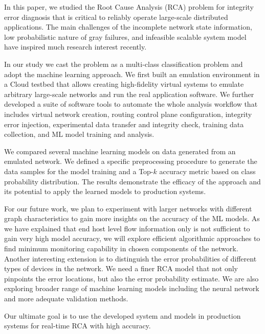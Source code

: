 In this paper, we studied the Root Cause Analysis (RCA) problem for integrity error diagnosis that is critical to reliably operate large-scale distributed applications. The main challenges of the incomplete network state information, low probabilistic nature of gray failures, and infeasible scalable system model have inspired much research interest recently.

In our study we cast the problem as a multi-class classification problem and adopt the machine learning approach. We first built an emulation environment in a Cloud testbed that allows creating high-fidelity virtual systems to emulate arbitrary large-scale networks and run the real application software. We further developed a suite of software tools to automate the whole analysis workflow that includes virtual network creation, routing control plane configuration, integrity error injection, experimental data transfer and integrity check, training data collection, and ML model training and analysis.

We compared several machine learning models on data generated from an emulated network. We defined a specific preprocessing procedure to generate the data samples for the model training and a Top-$k$ accuracy metric based on class probability distribution. The results demonstrate the efficacy of the approach and its potential to apply the learned models to production systems.  

For our future work, we plan to experiment with larger networks with different graph characteristics to gain more insights on the accuracy of the ML models. As we have explained that end host level flow information only is not sufficient to gain very high model accuracy, we will explore efficient algorithmic approaches to find minimum monitoring capability in chosen components of the network. Another interesting extension is to distinguish the error probabilities of different types of devices in the network. We need a finer RCA model that not only pinpoints the error locations, but also the error probability estimate. We are also exploring broader range of machine learning models including the neural network and more adequate validation methods. 

Our ultimate goal is to use the developed system and models in production systems for real-time RCA with high accuracy.

